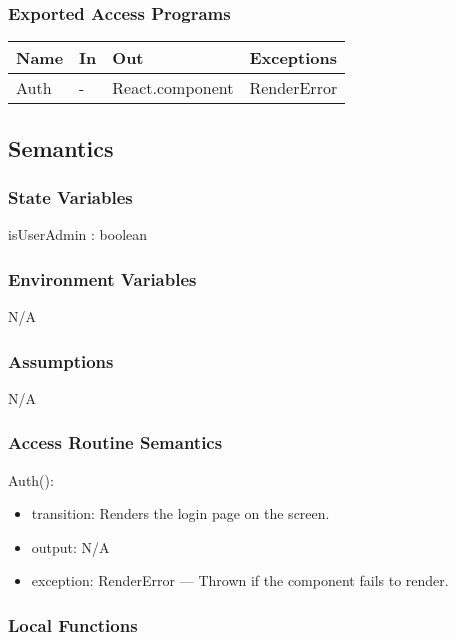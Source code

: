 \documentclass[12pt, titlepage]{article}
\begin{document}
\subsubsection{Exported Access Programs}

\begin{center}
\begin{tabular}{p{3cm} p{4cm} p{3cm} p{3.5cm}}
\hline
\textbf{Name} & \textbf{In} & \textbf{Out} & \textbf{Exceptions} \\
\hline
Auth & - & React.component &  RenderError\\
\hline
\end{tabular}
\end{center}

\subsection{Semantics}

\subsubsection{State Variables}
isUserAdmin : boolean

\subsubsection{Environment Variables}
N/A

\subsubsection{Assumptions}
N/A

\subsubsection{Access Routine Semantics}

\noindent Auth():
\begin{itemize}
\item transition: Renders the login page on the screen.
\item output: N/A
\item exception: RenderError — Thrown if the component fails to render.
\end{itemize}

\subsubsection{Local Functions}
\end{document}
